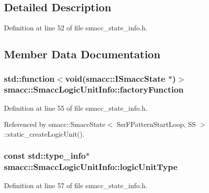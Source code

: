\subsection{Detailed Description}


Definition at line 52 of file smacc\+\_\+state\+\_\+info.\+h.



\subsection{Member Data Documentation}
\subsubsection[{\texorpdfstring{factory\+Function}{factoryFunction}}]{\setlength{\rightskip}{0pt plus 5cm}std\+::function$<$void({\bf smacc\+::\+I\+Smacc\+State} $\ast$)$>$ smacc\+::\+Smacc\+Logic\+Unit\+Info\+::factory\+Function}\hypertarget{structsmacc_1_1SmaccLogicUnitInfo_a2d4291cbae69ced8549ce7cd6c5e6820}{}\label{structsmacc_1_1SmaccLogicUnitInfo_a2d4291cbae69ced8549ce7cd6c5e6820}


Definition at line 55 of file smacc\+\_\+state\+\_\+info.\+h.



Referenced by smacc\+::\+Smacc\+State$<$ Ssr\+F\+Pattern\+Start\+Loop, S\+S $>$\+::static\+\_\+create\+Logic\+Unit().

\subsubsection[{\texorpdfstring{logic\+Unit\+Type}{logicUnitType}}]{\setlength{\rightskip}{0pt plus 5cm}const std\+::type\+\_\+info$\ast$ smacc\+::\+Smacc\+Logic\+Unit\+Info\+::logic\+Unit\+Type}\hypertarget{structsmacc_1_1SmaccLogicUnitInfo_a23f4cb45a6502b1493afec8eb28c9d71}{}\label{structsmacc_1_1SmaccLogicUnitInfo_a23f4cb45a6502b1493afec8eb28c9d71}


Definition at line 57 of file smacc\+\_\+state\+\_\+info.\+h.



